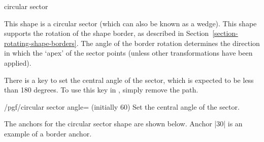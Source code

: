 \begin{shape}{circular sector}

	This shape is a circular sector (which can also be known as a
	wedge).
	This shape supports the rotation of the shape border, 
	as described in Section~\ref{section-rotating-shape-borders}. 
	The angle of the border rotation determines the direction in which 
	the `apex' of the sector points (unless other transformations have 
	been applied).
	
\begin{codeexample}[]
\end{codeexample}

	There is a \pgfname{} key to set the central angle of the sector, 
	which is expected to be less than 180 degrees. 
	To use this key in \tikzname,	simply remove the  
	path.
	
	\begin{key}{/pgf/circular sector angle= (initially 60)}
		Set the central angle of the sector. 
	\end{key}
	
	The anchors for the circular sector shape are shown below.
	Anchor |30| is an example of a border anchor.
	
\begin{codeexample}[]
\Huge
{}
\end{codeexample}
\end{shape}




